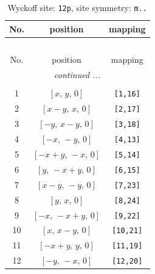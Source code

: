 \documentclass[fleqn,8pt]{jsarticle}
\begin{document}
\begin{longtable}{ccc}
\caption{Wyckoff site: {\tt 12p}, site symmetry: {\tt m..}}
 \\
 \hline \hline
No. & position & mapping \\ \hline \endfirsthead

\multicolumn{2}{l}{\tablename\ \thetable{}} \\
 \hline \hline
No. & position & mapping \\ \hline \endhead

 \hline \hline
\multicolumn{2}{r}{\footnotesize\it continued ...} \\ \endfoot

 \hline \hline
\multicolumn{2}{r}{} \\ \endlastfoot

1 & $\left[ x,\, y,\, 0 \right]$ & {\tt [1,16]} \\ \hline
2 & $\left[ x - y,\, x,\, 0 \right]$ & {\tt [2,17]} \\ \hline
3 & $\left[ - y,\, x - y,\, 0 \right]$ & {\tt [3,18]} \\ \hline
4 & $\left[ - x,\, - y,\, 0 \right]$ & {\tt [4,13]} \\ \hline
5 & $\left[ - x + y,\, - x,\, 0 \right]$ & {\tt [5,14]} \\ \hline
6 & $\left[ y,\, - x + y,\, 0 \right]$ & {\tt [6,15]} \\ \hline
7 & $\left[ x - y,\, - y,\, 0 \right]$ & {\tt [7,23]} \\ \hline
8 & $\left[ y,\, x,\, 0 \right]$ & {\tt [8,24]} \\ \hline
9 & $\left[ - x,\, - x + y,\, 0 \right]$ & {\tt [9,22]} \\ \hline
10 & $\left[ x,\, x - y,\, 0 \right]$ & {\tt [10,21]} \\ \hline
11 & $\left[ - x + y,\, y,\, 0 \right]$ & {\tt [11,19]} \\ \hline
12 & $\left[ - y,\, - x,\, 0 \right]$ & {\tt [12,20]} \\
\end{longtable}
\renewcommand{\arraystretch}{1.2}
\end{document}
